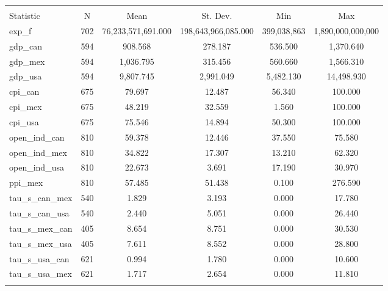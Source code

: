 
\begin{tabular}{@{\extracolsep{5pt}}lccccc} 
\\[-1.8ex]\hline 
\hline \\[-1.8ex] 
Statistic & \multicolumn{1}{c}{N} & \multicolumn{1}{c}{Mean} & \multicolumn{1}{c}{St. Dev.} & \multicolumn{1}{c}{Min} & \multicolumn{1}{c}{Max} \\ 
exp\_f & 702 & 76,233,571,691.000 & 198,643,966,085.000 & 399,038,863 & 1,890,000,000,000 \\ 
gdp\_can & 594 & 908.568 & 278.187 & 536.500 & 1,370.640 \\ 
gdp\_mex & 594 & 1,036.795 & 315.456 & 560.660 & 1,566.310 \\ 
gdp\_usa & 594 & 9,807.745 & 2,991.049 & 5,482.130 & 14,498.930 \\ 
cpi\_can & 675 & 79.697 & 12.487 & 56.340 & 100.000 \\ 
cpi\_mex & 675 & 48.219 & 32.559 & 1.560 & 100.000 \\ 
cpi\_usa & 675 & 75.546 & 14.894 & 50.300 & 100.000 \\ 
open\_ind\_can & 810 & 59.378 & 12.446 & 37.550 & 75.580 \\ 
open\_ind\_mex & 810 & 34.822 & 17.307 & 13.210 & 62.320 \\ 
open\_ind\_usa & 810 & 22.673 & 3.691 & 17.190 & 30.970 \\ 
ppi\_mex & 810 & 57.485 & 51.438 & 0.100 & 276.590 \\ 
tau\_s\_can\_mex & 540 & 1.829 & 3.193 & 0.000 & 17.780 \\ 
tau\_s\_can\_usa & 540 & 2.440 & 5.051 & 0.000 & 26.440 \\ 
tau\_s\_mex\_can & 405 & 8.654 & 8.751 & 0.000 & 30.530 \\ 
tau\_s\_mex\_usa & 405 & 7.611 & 8.552 & 0.000 & 28.800 \\ 
tau\_s\_usa\_can & 621 & 0.994 & 1.780 & 0.000 & 10.600 \\ 
tau\_s\_usa\_mex & 621 & 1.717 & 2.654 & 0.000 & 11.810 \\ 
\hline \\[-1.8ex] 
\end{tabular} 
